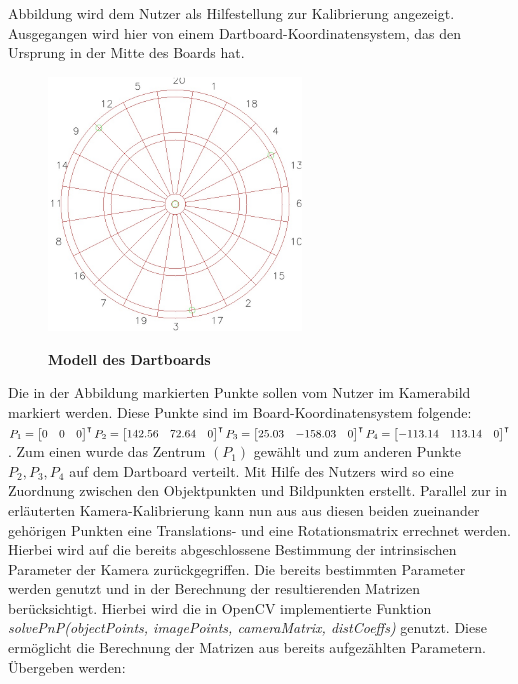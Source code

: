Abbildung  wird dem Nutzer als Hilfestellung zur Kalibrierung angezeigt. Ausgegangen wird hier von einem Dartboard-Koordinatensystem, das den Ursprung in der Mitte des Boards hat.  
\begin{figure}
\centering
\includegraphics[width=0.6\textwidth]{media/confighints.jpg}\\
\caption{\textbf{Modell des Dartboards}}
\label{Fig:dartmodel}
\end{figure}
Die in der Abbildung markierten Punkte sollen vom Nutzer im Kamerabild markiert werden. 
Diese Punkte sind im Board-Koordinatensystem folgende:
$P_1 = \begin{bmatrix}0& 0& 0 \\\end{bmatrix}^\intercal 
P_2 = \begin{bmatrix}142.56& 72.64& 0 \\\end{bmatrix}^\intercal\\
P_3 = \begin{bmatrix}25.03& -158.03& 0 \\\end{bmatrix}^\intercal
P_4 = \begin{bmatrix}-113.14& 113.14& 0 \\\end{bmatrix}^\intercal$.
Zum einen wurde das Zentrum $(P_1)$ gewählt und zum anderen Punkte $P_2,P_3,P_4$ auf dem Dartboard verteilt. Mit Hilfe des Nutzers wird so eine Zuordnung zwischen den Objektpunkten und Bildpunkten erstellt. Parallel zur in  erläuterten Kamera-Kalibrierung kann nun aus aus diesen beiden zueinander gehörigen Punkten eine Translations- und eine Rotationsmatrix errechnet werden. Hierbei wird auf die bereits abgeschlossene Bestimmung der intrinsischen Parameter der Kamera zurückgegriffen. Die bereits bestimmten Parameter werden genutzt und in der Berechnung der resultierenden Matrizen berücksichtigt. Hierbei wird die in OpenCV implementierte Funktion \textit{solvePnP(objectPoints, imagePoints, cameraMatrix, distCoeffs)} genutzt. Diese ermöglicht die Berechnung der Matrizen aus bereits aufgezählten Parametern. Übergeben werden:
